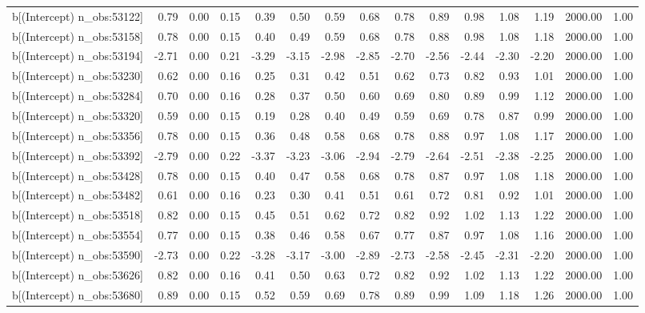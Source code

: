 \begin{table}[ht]
\begin{tabular}{rrrrrrrrrrrrrrr}
  b[(Intercept) n\_obs:53122] & 0.79 & 0.00 & 0.15 & 0.39 & 0.50 & 0.59 & 0.68 & 0.78 & 0.89 & 0.98 & 1.08 & 1.19 & 2000.00 & 1.00 \\ 
  b[(Intercept) n\_obs:53158] & 0.78 & 0.00 & 0.15 & 0.40 & 0.49 & 0.59 & 0.68 & 0.78 & 0.88 & 0.98 & 1.08 & 1.18 & 2000.00 & 1.00 \\ 
  b[(Intercept) n\_obs:53194] & -2.71 & 0.00 & 0.21 & -3.29 & -3.15 & -2.98 & -2.85 & -2.70 & -2.56 & -2.44 & -2.30 & -2.20 & 2000.00 & 1.00 \\ 
  b[(Intercept) n\_obs:53230] & 0.62 & 0.00 & 0.16 & 0.25 & 0.31 & 0.42 & 0.51 & 0.62 & 0.73 & 0.82 & 0.93 & 1.01 & 2000.00 & 1.00 \\ 
  b[(Intercept) n\_obs:53284] & 0.70 & 0.00 & 0.16 & 0.28 & 0.37 & 0.50 & 0.60 & 0.69 & 0.80 & 0.89 & 0.99 & 1.12 & 2000.00 & 1.00 \\ 
  b[(Intercept) n\_obs:53320] & 0.59 & 0.00 & 0.15 & 0.19 & 0.28 & 0.40 & 0.49 & 0.59 & 0.69 & 0.78 & 0.87 & 0.99 & 2000.00 & 1.00 \\ 
  b[(Intercept) n\_obs:53356] & 0.78 & 0.00 & 0.15 & 0.36 & 0.48 & 0.58 & 0.68 & 0.78 & 0.88 & 0.97 & 1.08 & 1.17 & 2000.00 & 1.00 \\ 
  b[(Intercept) n\_obs:53392] & -2.79 & 0.00 & 0.22 & -3.37 & -3.23 & -3.06 & -2.94 & -2.79 & -2.64 & -2.51 & -2.38 & -2.25 & 2000.00 & 1.00 \\ 
  b[(Intercept) n\_obs:53428] & 0.78 & 0.00 & 0.15 & 0.40 & 0.47 & 0.58 & 0.68 & 0.78 & 0.87 & 0.97 & 1.08 & 1.18 & 2000.00 & 1.00 \\ 
  b[(Intercept) n\_obs:53482] & 0.61 & 0.00 & 0.16 & 0.23 & 0.30 & 0.41 & 0.51 & 0.61 & 0.72 & 0.81 & 0.92 & 1.01 & 2000.00 & 1.00 \\ 
  b[(Intercept) n\_obs:53518] & 0.82 & 0.00 & 0.15 & 0.45 & 0.51 & 0.62 & 0.72 & 0.82 & 0.92 & 1.02 & 1.13 & 1.22 & 2000.00 & 1.00 \\ 
  b[(Intercept) n\_obs:53554] & 0.77 & 0.00 & 0.15 & 0.38 & 0.46 & 0.58 & 0.67 & 0.77 & 0.87 & 0.97 & 1.08 & 1.16 & 2000.00 & 1.00 \\ 
  b[(Intercept) n\_obs:53590] & -2.73 & 0.00 & 0.22 & -3.28 & -3.17 & -3.00 & -2.89 & -2.73 & -2.58 & -2.45 & -2.31 & -2.20 & 2000.00 & 1.00 \\ 
  b[(Intercept) n\_obs:53626] & 0.82 & 0.00 & 0.16 & 0.41 & 0.50 & 0.63 & 0.72 & 0.82 & 0.92 & 1.02 & 1.13 & 1.22 & 2000.00 & 1.00 \\ 
  b[(Intercept) n\_obs:53680] & 0.89 & 0.00 & 0.15 & 0.52 & 0.59 & 0.69 & 0.78 & 0.89 & 0.99 & 1.09 & 1.18 & 1.26 & 2000.00 & 1.00 \\ 

\end{tabular}
\end{table}
